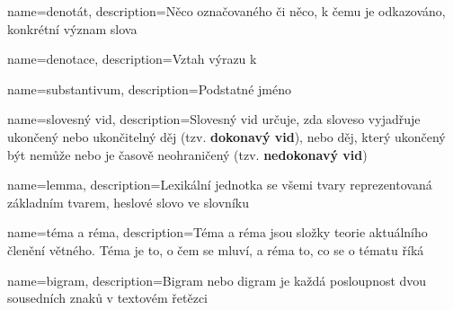 {
	name=denotát,
	description={Něco označovaného či něco, k čemu je odkazováno, konkrétní význam slova}
}

{
	name=denotace,
	description={Vztah výrazu k }
}

{
	name=substantivum,
	description={Podstatné jméno}
}

{
	name=slovesný vid,
	description={Slovesný vid určuje, zda sloveso vyjadřuje ukončený nebo ukončitelný děj (tzv. \textbf{dokonavý vid}), nebo děj, který ukončený být nemůže nebo je časově neohraničený (tzv. \textbf{nedokonavý vid})}
}

{
	name=lemma,
	description={Lexikální jednotka se všemi tvary reprezentovaná základním tvarem, heslové slovo ve slovníku}
}

{
	name=téma a réma,
	description={Téma a réma jsou složky teorie aktuálního členění větného. Téma je to, o čem se mluví, a réma to, co se o tématu říká }
}

{
	name=bigram,
	description={Bigram nebo digram je každá posloupnost dvou sousedních znaků v textovém řetězci}
}






